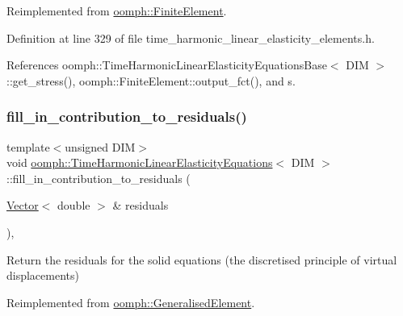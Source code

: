 Reimplemented from \hyperlink{classoomph_1_1FiniteElement_a0ae7af222af38a0d53bf283dc85bdfea}{oomph\+::\+Finite\+Element}.



Definition at line 329 of file time\+\_\+harmonic\+\_\+linear\+\_\+elasticity\+\_\+elements.\+h.



References oomph\+::\+Time\+Harmonic\+Linear\+Elasticity\+Equations\+Base$<$ D\+I\+M $>$\+::get\+\_\+stress(), oomph\+::\+Finite\+Element\+::output\+\_\+fct(), and s.

\mbox{\label{classoomph_1_1TimeHarmonicLinearElasticityEquations_aed703e899b784e5bb2a0c7b9d8291d42}} 
\subsubsection{\texorpdfstring{fill\+\_\+in\+\_\+contribution\+\_\+to\+\_\+residuals()}{fill\_in\_contribution\_to\_residuals()}}
{\footnotesize\ttfamily template$<$unsigned D\+IM$>$ \\
void \hyperlink{classoomph_1_1TimeHarmonicLinearElasticityEquations}{oomph\+::\+Time\+Harmonic\+Linear\+Elasticity\+Equations}$<$ D\+IM $>$\+::fill\+\_\+in\+\_\+contribution\+\_\+to\+\_\+residuals (\begin{DoxyParamCaption}\item[{\hyperlink{classoomph_1_1Vector}{Vector}$<$ double $>$ \&}]{residuals }\end{DoxyParamCaption})\hspace{0.3cm}{\ttfamily [inline]}, {\ttfamily [virtual]}}



Return the residuals for the solid equations (the discretised principle of virtual displacements) 



Reimplemented from \hyperlink{classoomph_1_1GeneralisedElement_a310c97f515e8504a48179c0e72c550d7}{oomph\+::\+Generalised\+Element}.



